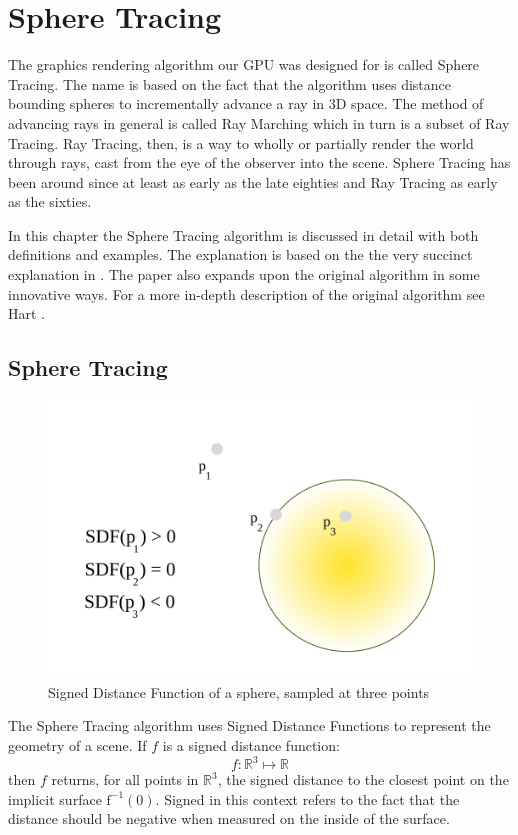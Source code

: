 \chapter{Sphere Tracing} \label{spheretracing}

	The graphics rendering algorithm our GPU was designed for is called Sphere
	Tracing\cite{Hart1996}. The name is based on the fact that the algorithm
	uses distance bounding spheres to incrementally advance a ray in 3D space.
	The method of advancing rays in general is called Ray Marching which in
	turn is a subset of Ray Tracing\cite{Whitted1980a}. Ray Tracing, then, is a
	way to wholly or partially render the world through rays, cast from the eye
	of the observer into the scene\cite{PeterShirleyMichaelAshikhmin2005}. 
	Sphere Tracing has been	around since at least as early as the late 
	eighties\cite{Hart1989} and Ray Tracing as early as the 
	sixties\cite{Appel1968}.

	In this chapter the Sphere Tracing algorithm is discussed in detail with
	both definitions and examples. The explanation is based on the the very
	succinct explanation in \cite{Korndorfer2014}. The paper also expands upon
	the original algorithm in some innovative ways. For a more in-depth
	description of the original algorithm see Hart \cite{Hart1996}.

	\section{Sphere Tracing} 

		\begin{figure}
			\includegraphics[width=0.75\linewidth]{figure/SDF} 
			\caption{Signed Distance Function of a sphere, sampled at three 
				points}
		\end{figure}

		The Sphere Tracing algorithm uses Signed Distance Functions to
		represent the geometry of a scene. If $f$ is a signed distance
		function: $$f : \mathbb{R}^{3}\mapsto\mathbb{R}$$ then $f$ returns, for
		all points in $\mathbb{R}^3$, the signed distance to the closest point
		on the implicit surface $\text{f}^{-1}(0)$. Signed in this context
		refers to the fact that the distance should be negative when measured
		on the inside of the surface.

